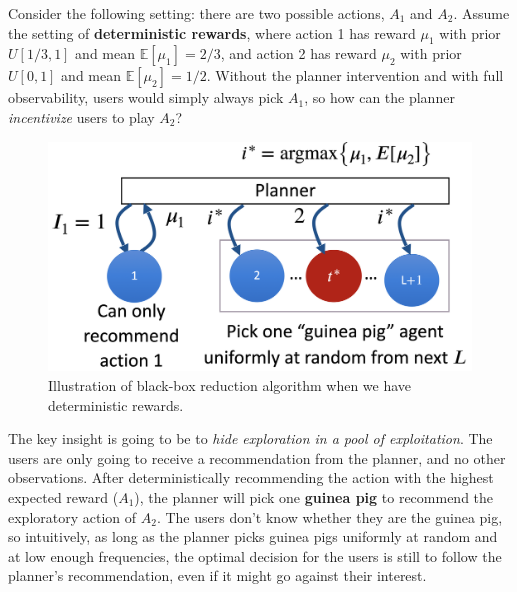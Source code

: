 \documentclass[
  letterpaper,
  DIV=11,
  numbers=noendperiod,
  oneside]{scrreprt}
\theoremstyle{remark}
\begin{document}
Consider the following setting: there are two possible actions, \(A_1\)
and \(A_2\). Assume the setting of \textbf{deterministic rewards}, where
action 1 has reward \(\mu_1\) with prior \(U[1/3, 1]\) and mean
\(\mathbb{E}[\mu_1] = 2/3\), and action 2 has reward \(\mu_2\) with
prior \(U[0, 1]\) and mean \(\mathbb{E}[\mu_2] = 1/2\). Without the
planner intervention and with full observability, users would simply
always pick \(A_1\), so how can the planner \emph{incentivize} users to
play \(A_2\)?

\begin{figure}

{\centering \includegraphics{Figures/guinea_pig_fig.png}

}

\caption{Illustration of black-box reduction algorithm when we have
deterministic rewards.}

\end{figure}%

The key insight is going to be to \emph{hide exploration in a pool of
exploitation}. The users are only going to receive a recommendation from
the planner, and no other observations. After deterministically
recommending the action with the highest expected reward (\(A_1\)), the
planner will pick one \textbf{guinea pig} to recommend the exploratory
action of \(A_2\). The users don't know whether they are the guinea pig,
so intuitively, as long as the planner picks guinea pigs uniformly at
random and at low enough frequencies, the optimal decision for the users
is still to follow the planner's recommendation, even if it might go
against their interest.
\end{document}
